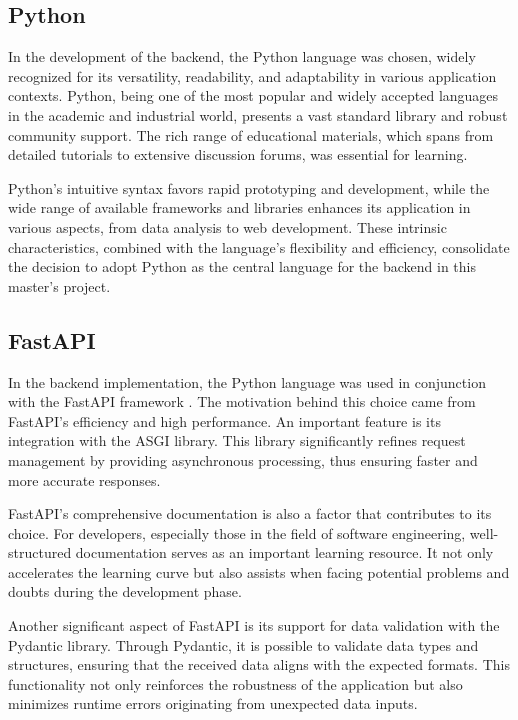 \subsection{Python}
In the development of the backend, the Python language \cite{pythonOfficialDocs} was chosen, widely recognized for its versatility, readability, and adaptability in various application contexts. Python, being one of the most popular and widely accepted languages in the academic and industrial world, presents a vast standard library and robust community support. The rich range of educational materials, which spans from detailed tutorials to extensive discussion forums, was essential for learning.

Python's intuitive syntax favors rapid prototyping and development, while the wide range of available frameworks and libraries enhances its application in various aspects, from data analysis to web development. These intrinsic characteristics, combined with the language's flexibility and efficiency, consolidate the decision to adopt Python as the central language for the backend in this master's project.

\subsection{FastAPI}
In the backend implementation, the Python language was used in conjunction with the FastAPI framework \cite{fastapiDocs}. The motivation behind this choice came from FastAPI's efficiency and high performance. An important feature is its integration with the \gls{ASGI} library. This library significantly refines request management by providing asynchronous processing, thus ensuring faster and more accurate responses.

FastAPI's comprehensive documentation is also a factor that contributes to its choice. For developers, especially those in the field of software engineering, well-structured documentation serves as an important learning resource. It not only accelerates the learning curve but also assists when facing potential problems and doubts during the development phase.

Another significant aspect of FastAPI is its support for data validation with the Pydantic library. Through Pydantic, it is possible to validate data types and structures, ensuring that the received data aligns with the expected formats. This functionality not only reinforces the robustness of the application but also minimizes runtime errors originating from unexpected data inputs.

